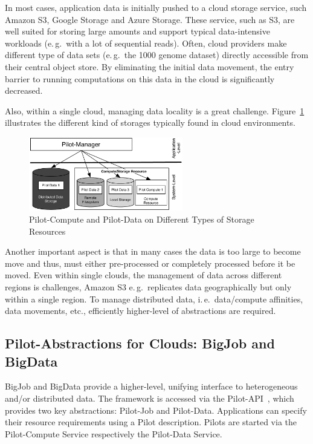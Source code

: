 \documentclass[times]{cpeauth}
\newcommand{\pilot}{Pilot\xspace}
\newcommand{\pilots}{Pilots\xspace}
\newcommand{\pilotjob}{Pilot-Job\xspace}
\newcommand{\pilotdata}{Pilot-Data\xspace}
\newcommand{\pilotdataservice}{Pilot-Data Service\xspace}
\newcommand{\pilotcomputeservice}{Pilot-Compute Service\xspace}
\begin{document}
In most cases, application data is initially pushed to a cloud storage
service, such Amazon S3, Google Storage and Azure Storage. These service, such
as S3, are well suited for storing large amounts and support typical
data-intensive workloads (e.\,g.\ with a lot of sequential reads). Often,
cloud providers make different type of data sets (e.\,g.\ the 1000 genome
dataset) directly accessible from their central object store. By eliminating
the initial data movement, the entry barrier to running computations on this
data in the cloud is significantly decreased.

Also, within a single cloud, managing data locality is a great challenge. 
Figure~\ref{fig:figures_storage-types} illustrates the different kind of 
storages typically found in cloud environments. 
\begin{figure}[t]
	\centering
		\includegraphics[width=0.6\textwidth]{figures/storage-types.pdf}
	\caption{Pilot-Compute and Pilot-Data on Different Types of Storage Resources}
	\label{fig:figures_storage-types}
\end{figure}

Another important aspect is that in many cases the data is too large to become
move and thus, must either pre-processed or completely processed before it be 
moved. Even within single clouds, the management of data across different 
regions is challenges, Amazon S3 e.\,g.\ replicates data geographically but 
only within a single region. To manage distributed data, i.\,e.\ data/compute 
affinities, data movements, etc., efficiently higher-level of abstractions
are required.




\subsection{Pilot-Abstractions for Clouds: BigJob and BigData}

BigJob and BigData provide a higher-level, unifying interface to heterogeneous
and/or distributed data. The framework is accessed via the
Pilot-API~\cite{pilot_api}, which provides two key abstractions: \pilotjob and
\pilotdata. Applications can specify their resource requirements using a
\pilot description. \pilots are started via the \pilotcomputeservice
respectively the \pilotdataservice.
\end{document}
